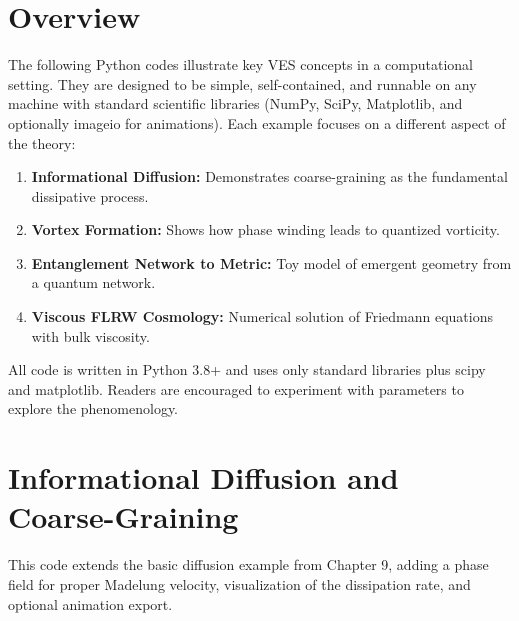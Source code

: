 \documentclass[12pt,a4paper]{book}
\begin{document}
\section{Overview}

The following Python codes illustrate key VES concepts in a computational setting. They are designed to be simple, self-contained, and runnable on any machine with standard scientific libraries (NumPy, SciPy, Matplotlib, and optionally imageio for animations). Each example focuses on a different aspect of the theory:
\begin{enumerate}
    \item \textbf{Informational Diffusion:} Demonstrates coarse-graining as the fundamental dissipative process.
    \item \textbf{Vortex Formation:} Shows how phase winding leads to quantized vorticity.
    \item \textbf{Entanglement Network to Metric:} Toy model of emergent geometry from a quantum network.
    \item \textbf{Viscous FLRW Cosmology:} Numerical solution of Friedmann equations with bulk viscosity.
\end{enumerate}
All code is written in Python 3.8+ and uses only standard libraries plus scipy and matplotlib. Readers are encouraged to experiment with parameters to explore the phenomenology.

\section{Informational Diffusion and Coarse-Graining}

This code extends the basic diffusion example from Chapter 9, adding a phase field for proper Madelung velocity, visualization of the dissipation rate, and optional animation export.
\end{document}
